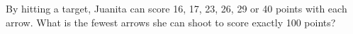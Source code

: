 By hitting a target, Juanita can score 16, 17, 23, 26, 29 or 40 points with each arrow. What is the fewest arrows she can shoot to score exactly 100 points?
